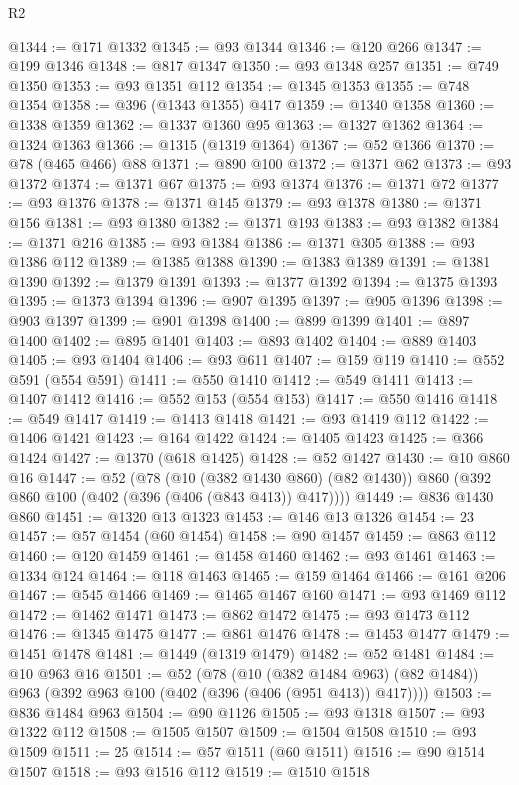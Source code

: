 \begin{lexlean}{R2}
\begin{coremodule}
@1344 := @171 @1332
@1345 := @93 @1344
@1346 := @120 @266
@1347 := @199 @1346
@1348 := @817 @1347
@1350 := @93 @1348 @257
@1351 := @749 @1350
@1353 := @93 @1351 @112
@1354 := @1345 @1353
@1355 := @748 @1354
@1358 := @396 (@1343 @1355) @417
@1359 := @1340 @1358
@1360 := @1338 @1359
@1362 := @1337 @1360 @95
@1363 := @1327 @1362
@1364 := @1324 @1363
@1366 := @1315 (@1319 @1364)
@1367 := @52 @1366
@1370 := @78 (@465 @466) @88
@1371 := @890 @100
@1372 := @1371 @62
@1373 := @93 @1372
@1374 := @1371 @67
@1375 := @93 @1374
@1376 := @1371 @72
@1377 := @93 @1376
@1378 := @1371 @145
@1379 := @93 @1378
@1380 := @1371 @156
@1381 := @93 @1380
@1382 := @1371 @193
@1383 := @93 @1382
@1384 := @1371 @216
@1385 := @93 @1384
@1386 := @1371 @305
@1388 := @93 @1386 @112
@1389 := @1385 @1388
@1390 := @1383 @1389
@1391 := @1381 @1390
@1392 := @1379 @1391
@1393 := @1377 @1392
@1394 := @1375 @1393
@1395 := @1373 @1394
@1396 := @907 @1395
@1397 := @905 @1396
@1398 := @903 @1397
@1399 := @901 @1398
@1400 := @899 @1399
@1401 := @897 @1400
@1402 := @895 @1401
@1403 := @893 @1402
@1404 := @889 @1403
@1405 := @93 @1404
@1406 := @93 @611
@1407 := @159 @119
@1410 := @552 @591 (@554 @591)
@1411 := @550 @1410
@1412 := @549 @1411
@1413 := @1407 @1412
@1416 := @552 @153 (@554 @153)
@1417 := @550 @1416
@1418 := @549 @1417
@1419 := @1413 @1418
@1421 := @93 @1419 @112
@1422 := @1406 @1421
@1423 := @164 @1422
@1424 := @1405 @1423
@1425 := @366 @1424
@1427 := @1370 (@618 @1425)
@1428 := @52 @1427
@1430 := @10 @860 @16
@1447 := @52
    (@78
      (@10 (@382 @1430 @860) (@82 @1430))
      @860
      (@392 @860 @100 (@402 (@396 (@406 (@843 @413)) @417))))
@1449 := @836 @1430 @860
@1451 := @1320 @13 @1323
@1453 := @146 @13 @1326
@1454 := 23
@1457 := @57 @1454 (@60 @1454)
@1458 := @90 @1457
@1459 := @863 @112
@1460 := @120 @1459
@1461 := @1458 @1460
@1462 := @93 @1461
@1463 := @1334 @124
@1464 := @118 @1463
@1465 := @159 @1464
@1466 := @161 @206
@1467 := @545 @1466
@1469 := @1465 @1467 @160
@1471 := @93 @1469 @112
@1472 := @1462 @1471
@1473 := @862 @1472
@1475 := @93 @1473 @112
@1476 := @1345 @1475
@1477 := @861 @1476
@1478 := @1453 @1477
@1479 := @1451 @1478
@1481 := @1449 (@1319 @1479)
@1482 := @52 @1481
@1484 := @10 @963 @16
@1501 := @52
    (@78
      (@10 (@382 @1484 @963) (@82 @1484))
      @963
      (@392 @963 @100 (@402 (@396 (@406 (@951 @413)) @417))))
@1503 := @836 @1484 @963
@1504 := @90 @1126
@1505 := @93 @1318
@1507 := @93 @1322 @112
@1508 := @1505 @1507
@1509 := @1504 @1508
@1510 := @93 @1509
@1511 := 25
@1514 := @57 @1511 (@60 @1511)
@1516 := @90 @1514 @1507
@1518 := @93 @1516 @112
@1519 := @1510 @1518

\end{coremodule}
\end{lexlean}
